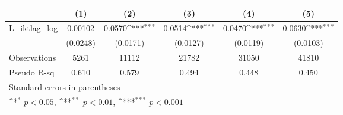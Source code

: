 {
\def\sym#1{\ifmmode^{#1}\else\(^{#1}\)\fi}
\begin{tabular}{l*{5}{c}}
\hline\hline
                &\multicolumn{1}{c}{(1)}         &\multicolumn{1}{c}{(2)}         &\multicolumn{1}{c}{(3)}         &\multicolumn{1}{c}{(4)}         &\multicolumn{1}{c}{(5)}         \\
\hline
L\_iktlag\_log    &  0.00102         &   0.0570\sym{***}&   0.0514\sym{***}&   0.0470\sym{***}&   0.0630\sym{***}\\
                & (0.0248)         & (0.0171)         & (0.0127)         & (0.0119)         & (0.0103)         \\
\hline
Observations    &     5261         &    11112         &    21782         &    31050         &    41810         \\
Pseudo R-sq     &    0.610         &    0.579         &    0.494         &    0.448         &    0.450         \\
\hline\hline
\multicolumn{6}{l}{\footnotesize Standard errors in parentheses}\\
\multicolumn{6}{l}{\footnotesize \sym{*} \(p<0.05\), \sym{**} \(p<0.01\), \sym{***} \(p<0.001\)}\\
\end{tabular}
}

